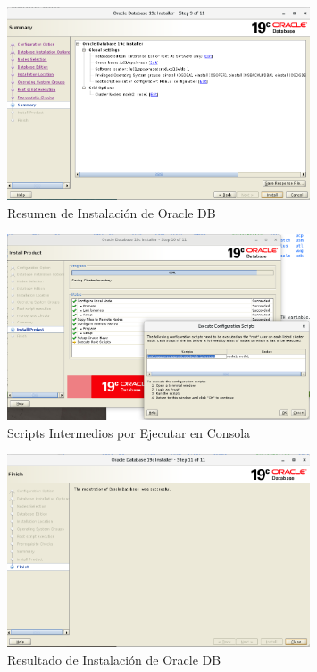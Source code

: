 \documentclass{article}
\begin{document}
\begin{figure}[H]
		\begin{center}
			\includegraphics[width=0.80\textwidth]{db_install_10_summary_pre_install.png}
		\end{center}
		\caption{Resumen de Instalación de Oracle DB}
\end{figure}

\begin{figure}[H]
		\begin{center}
			\includegraphics[width=0.80\textwidth]{db_install_10_installation_script.png}
		\end{center}
		\caption{Scripts Intermedios por Ejecutar en Consola}
\end{figure}

\begin{figure}[H]
		\begin{center}
			\includegraphics[width=0.80\textwidth]{db_install_11_finish.png}
		\end{center}
		\caption{Resultado de Instalación de Oracle DB}
\end{figure}
\end{document}
